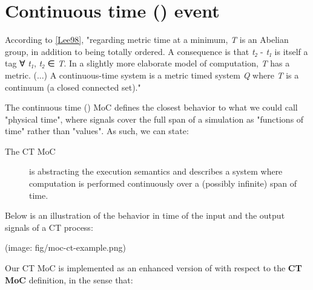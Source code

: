 \section{Continuous time () event}
According to \href{ForSyDe-Atom.html#lee98}{[Lee98]}, "{}regarding
 metric time{} at a minimum, \emph{T} is an Abelian group, in addition
 to being totally ordered. A consequence is that \emph{t₂} -
 \emph{t₁} is itself a tag ∀ \emph{t₁}, \emph{t₂} ∈
 \emph{T}. In a slightly more elaborate model of computation, \emph{T} has a
 metric. (...) A continuous-time system is a metric timed system
 \emph{Q} where \emph{T} is a continuum (a closed connected set)."\par
The continuous time () MoC defines the closest behavior to
 what we could call "physical time", where signals cover the full
 span of a simulation as "functions of time" rather than
 "values". As such, we can state:\par
\begin{description}
\item[The CT MoC] is abstracting the execution semantics and describes
 a system where computation is performed continuously over a
 (possibly infinite) span of time.
\end{description}Below is an illustration of the behavior in time of the input and
 the output signals of a CT process:\par
                 (image: fig/moc-ct-example.png)\par
                 Our CT MoC is implemented as an enhanced version of
  with respect to the \textbf{CT MoC} definition, in
 the sense that:\par
